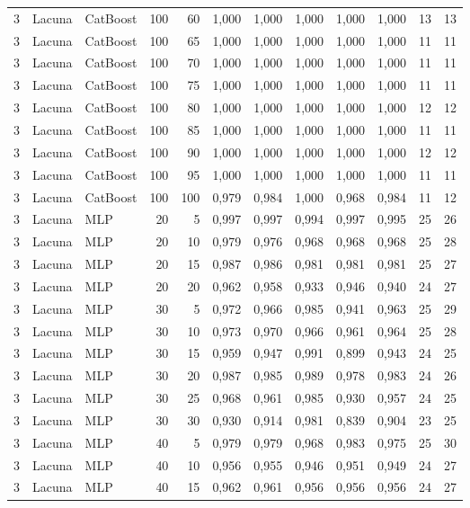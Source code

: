 \begin{longtable}{@{}rllrrrrrrrrr@{}}
3 & Lacuna & CatBoost & 100 & 60 & 1,000 & 1,000 & 1,000 & 1,000 & 1,000 & 13 & 13 \\
3 & Lacuna & CatBoost & 100 & 65 & 1,000 & 1,000 & 1,000 & 1,000 & 1,000 & 11 & 11 \\
3 & Lacuna & CatBoost & 100 & 70 & 1,000 & 1,000 & 1,000 & 1,000 & 1,000 & 11 & 11 \\
3 & Lacuna & CatBoost & 100 & 75 & 1,000 & 1,000 & 1,000 & 1,000 & 1,000 & 11 & 11 \\
3 & Lacuna & CatBoost & 100 & 80 & 1,000 & 1,000 & 1,000 & 1,000 & 1,000 & 12 & 12 \\
3 & Lacuna & CatBoost & 100 & 85 & 1,000 & 1,000 & 1,000 & 1,000 & 1,000 & 11 & 11 \\
3 & Lacuna & CatBoost & 100 & 90 & 1,000 & 1,000 & 1,000 & 1,000 & 1,000 & 12 & 12 \\
3 & Lacuna & CatBoost & 100 & 95 & 1,000 & 1,000 & 1,000 & 1,000 & 1,000 & 11 & 11 \\
3 & Lacuna & CatBoost & 100 & 100 & 0,979 & 0,984 & 1,000 & 0,968 & 0,984 & 11 & 12 \\
3 & Lacuna & MLP & 20 & 5 & 0,997 & 0,997 & 0,994 & 0,997 & 0,995 & 25 & 26 \\
3 & Lacuna & MLP & 20 & 10 & 0,979 & 0,976 & 0,968 & 0,968 & 0,968 & 25 & 28 \\
3 & Lacuna & MLP & 20 & 15 & 0,987 & 0,986 & 0,981 & 0,981 & 0,981 & 25 & 27 \\
3 & Lacuna & MLP & 20 & 20 & 0,962 & 0,958 & 0,933 & 0,946 & 0,940 & 24 & 27 \\
3 & Lacuna & MLP & 30 & 5 & 0,972 & 0,966 & 0,985 & 0,941 & 0,963 & 25 & 29 \\
3 & Lacuna & MLP & 30 & 10 & 0,973 & 0,970 & 0,966 & 0,961 & 0,964 & 25 & 28 \\
3 & Lacuna & MLP & 30 & 15 & 0,959 & 0,947 & 0,991 & 0,899 & 0,943 & 24 & 25 \\
3 & Lacuna & MLP & 30 & 20 & 0,987 & 0,985 & 0,989 & 0,978 & 0,983 & 24 & 26 \\
3 & Lacuna & MLP & 30 & 25 & 0,968 & 0,961 & 0,985 & 0,930 & 0,957 & 24 & 25 \\
3 & Lacuna & MLP & 30 & 30 & 0,930 & 0,914 & 0,981 & 0,839 & 0,904 & 23 & 25 \\
3 & Lacuna & MLP & 40 & 5 & 0,979 & 0,979 & 0,968 & 0,983 & 0,975 & 25 & 30 \\
3 & Lacuna & MLP & 40 & 10 & 0,956 & 0,955 & 0,946 & 0,951 & 0,949 & 24 & 27 \\
3 & Lacuna & MLP & 40 & 15 & 0,962 & 0,961 & 0,956 & 0,956 & 0,956 & 24 & 27 \\

\end{longtable}
